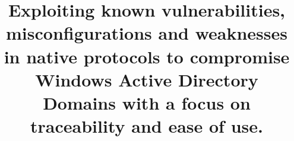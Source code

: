 
\usepackage[cache=false]{minted}



\usepackage{fancyhdr}
\usepackage{lastpage}

\pagestyle{fancy}
\fancyhf{}

\fancyhead[L]{\rightmark}
\title{\LARGE Exploiting known vulnerabilities, misconfigurations and weaknesses in native protocols to compromise Windows Active Directory Domains with a focus on traceability and ease of use.}



\gdef\BackMatter{
  \cleardoublepage
  \printbibliography[heading=bibintoc]
}

\usepackage[toc,page]{appendix}



\usepackage{csquotes}
\usepackage[english]{babel}

\addto\captionsenglish{%
  \renewcommand{\contentsname}%
    {Table of contents}%
}

